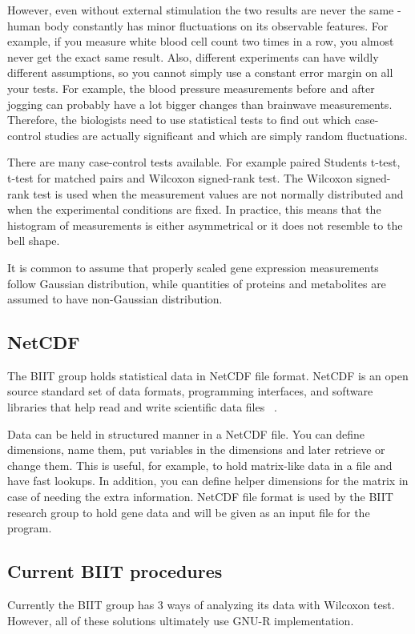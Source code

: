 \documentclass[12pt]{article}
\begin{document}
{However, even without external stimulation the two results are never the same - human body constantly has minor fluctuations on its observable features. For example, if you measure white blood cell count two times in a row, you almost never get the exact same result. Also, different experiments can have wildly different assumptions, so you cannot simply use a constant error margin on all your tests. For example, the blood pressure measurements before and after jogging can probably have a lot bigger changes than brainwave measurements. Therefore, the biologists need to use statistical tests to find out which case-control studies are actually significant and which are simply random fluctuations.

There are many case-control tests available. For example paired Students t-test, t-test for matched pairs and Wilcoxon signed-rank test. The Wilcoxon signed-rank test is used when the measurement values are not normally distributed and when the experimental conditions are fixed.  In practice, this means that the histogram of measurements is either asymmetrical or it does not resemble to the bell shape.

It is common to assume that properly scaled gene expression measurements follow Gaussian distribution, while quantities of proteins and metabolites are assumed to have non-Gaussian distribution.

\subsection{NetCDF}
The BIIT group holds statistical data in NetCDF file format. NetCDF is an open source standard set of data formats, programming interfaces, and software libraries that help read and write scientific data files ~\cite{Netcdf}.

Data can be held in structured manner in a NetCDF file. You can define dimensions, name them, put variables in the dimensions and later retrieve or change them. This is useful, for example, to hold matrix-like data in a file and have fast lookups. In addition, you can define helper dimensions for the matrix in case of needing the extra information. NetCDF file format is used by the BIIT research group to hold gene data and will be given as an input file for the program.

\subsection{Current BIIT procedures}
Currently the BIIT group has 3 ways of analyzing its data with Wilcoxon test. However, all of these solutions ultimately use GNU-R implementation.
}
\end{document}
